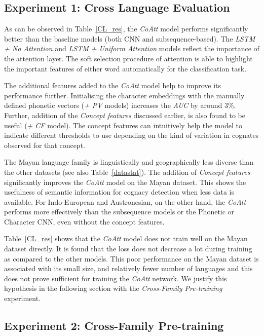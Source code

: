 \documentclass[11pt,letterpaper]{article}
\begin{document}
\subsection{Experiment 1: Cross Language Evaluation}

As can be observed in Table~\ref{CL_res}, the \textit{CoAtt} model performs significantly better than the baseline models (both CNN and subsequence-based). The \textit{LSTM + No Attention} and \textit{LSTM + Uniform Attention} models reflect the importance of the attention layer. The soft selection procedure of attention is able to highlight the important features of either word automatically for the classification task.  

The additional features added to the \textit{CoAtt} model help to improve its performance further. Initialising the character embeddings with the manually defined phonetic vectors (\textit{+ PV} models) increases the \textit{AUC} by around 3\%. Further, addition of the \textit{Concept features} discussed earlier, is also found to be useful (\textit{+ CF} model). The concept features can intuitively help the model to indicate different thresholds to use depending on the kind of variation in cognates observed for that concept. 

The Mayan language family is linguistically and geographically less diverse than the other datasets (see also Table~\ref{datastat}). The addition of \textit{Concept features} significantly improves the \textit{CoAtt} model on the Mayan dataset. This shows the usefulness of semantic information for cognacy detection when less data is available. For Indo-European and Austronesian, on the other hand, the \textit{CoAtt} performs more effectively than the subsequence models or the Phonetic or Character CNN, even without the concept features. 

Table~\ref{CL_res} shows that the \textit{CoAtt} model does not train well on the Mayan dataset directly. It is found that the loss does not decrease a lot during training as compared to the other models. This poor performance on the Mayan dataset is associated with its small size, and relatively fewer number of languages and this does not prove sufficient for training the \textit{CoAtt} network. 
We justify this hypothesis in the following section with the \textit{Cross-Family Pre-training} experiment.

\subsection{Experiment 2: Cross-Family Pre-training}
\end{document}

